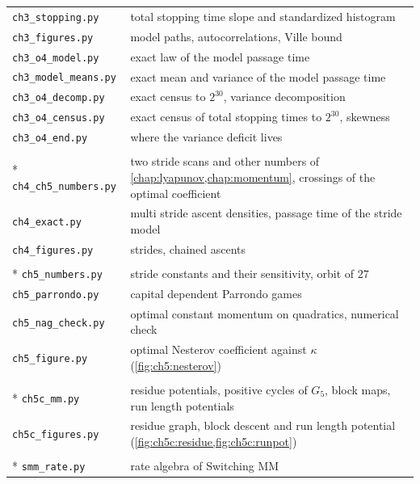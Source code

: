 {\begin{longtable}{@{}l>{\raggedright\arraybackslash}p{}@{}}
\texttt{ch3\_stopping.py} & total stopping time slope and standardized histogram \\
\texttt{ch3\_figures.py} & model paths, autocorrelations, Ville bound \\
\texttt{ch3\_o4\_model.py} & exact law of the model passage time \\
\texttt{ch3\_model\_means.py} & exact mean and variance of the model passage time \\
\texttt{ch3\_o4\_decomp.py} & exact census to $2^{30}$, variance decomposition \\
\texttt{ch3\_o4\_census.py} & exact census of total stopping times to $2^{30}$, skewness \\
\texttt{ch3\_o4\_end.py} & where the variance deficit lives \\
\addlinespace[4pt]
\multicolumn{2}{@{}l}{\itshape\Cref{chap:lyapunov}} \\*
\texttt{ch4\_ch5\_numbers.py} & two stride scans and other numbers of \cref{chap:lyapunov,chap:momentum}, crossings of the optimal coefficient \\
\texttt{ch4\_exact.py} & multi stride ascent densities, passage time of the stride model \\
\texttt{ch4\_figures.py} & strides, chained ascents \\
\addlinespace[4pt]
\multicolumn{2}{@{}l}{\itshape\Cref{chap:momentum}} \\*
\texttt{ch5\_numbers.py} & stride constants and their sensitivity, orbit of $27$ \\
\texttt{ch5\_parrondo.py} & capital dependent Parrondo games \\
\texttt{ch5\_nag\_check.py} & optimal constant momentum on quadratics, numerical check \\
\texttt{ch5\_figure.py} & optimal Nesterov coefficient against $\kappa$ (\cref{fig:ch5:nesterov}) \\
\addlinespace[4pt]
\multicolumn{2}{@{}l}{\itshape\Cref{chap:mmcollatz}} \\*
\texttt{ch5c\_mm.py} & residue potentials, positive cycles of $G_5$, block maps, run length potentials \\
\texttt{ch5c\_figures.py} & residue graph, block descent and run length potential (\cref{fig:ch5c:residue,fig:ch5c:runpot}) \\
\addlinespace[4pt]
\multicolumn{2}{@{}l}{\itshape\Cref{chap:smm}} \\*
\texttt{smm\_rate.py} & rate algebra of Switching MM \\

\end{longtable}}
